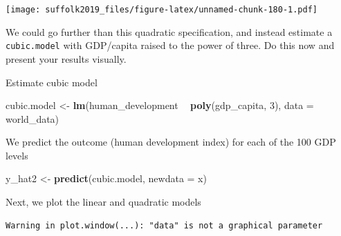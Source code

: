 \documentclass[]{article}
\newenvironment{Shaded}{\begin{snugshade}}{\end{snugshade}}
\newcommand{\DataTypeTok}[1]{\textcolor[rgb]{0.13,0.29,0.53}{#1}}
\newcommand{\DecValTok}[1]{\textcolor[rgb]{0.00,0.00,0.81}{#1}}
\newcommand{\KeywordTok}[1]{\textcolor[rgb]{0.13,0.29,0.53}{\textbf{#1}}}
\newcommand{\NormalTok}[1]{#1}
\newcommand{\OperatorTok}[1]{\textcolor[rgb]{0.81,0.36,0.00}{\textbf{#1}}}
\newcommand{\OtherTok}[1]{\textcolor[rgb]{0.56,0.35,0.01}{#1}}
\newcommand{\StringTok}[1]{\textcolor[rgb]{0.31,0.60,0.02}{#1}}
\begin{document}
\texttt{[image: suffolk2019\_files/figure-latex/unnamed-chunk-180-1.pdf]}

We could go further than this quadratic specification, and instead estimate a \texttt{cubic.model} with GDP/capita raised to the power of three. Do this now and present your results visually.

Estimate cubic model

\begin{Shaded}
\begin{Highlighting}[]
\NormalTok{cubic.model <-}\StringTok{ }\KeywordTok{lm}\NormalTok{(human_development }\OperatorTok{~}\StringTok{ }\KeywordTok{poly}\NormalTok{(gdp_capita, }\DecValTok{3}\NormalTok{), }\DataTypeTok{data =}\NormalTok{ world_data)}
\end{Highlighting}
\end{Shaded}

We predict the outcome (human development index) for each of the 100 GDP levels

\begin{Shaded}
\begin{Highlighting}[]
\NormalTok{y_hat2 <-}\StringTok{ }\KeywordTok{predict}\NormalTok{(cubic.model, }\DataTypeTok{newdata =}\NormalTok{ x)}
\end{Highlighting}
\end{Shaded}

Next, we plot the linear and quadratic models

\begin{Shaded}
\end{Shaded}

\begin{verbatim}
Warning in plot.window(...): "data" is not a graphical parameter
\end{verbatim}
\end{document}
